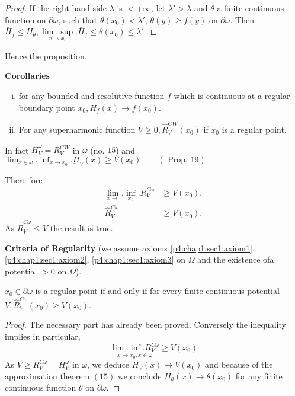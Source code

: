 \begin{proof}
  If the right hand side $\lambda$ is $< + \infty$, let $\lambda' >
  \lambda$ and $\theta$ a finite continuous function on $\partial
  \omega$, such that $\theta (x_0) < \lambda'$, $\theta (y) \geq f(y)$
  on $\partial \omega$. Then $\bar{H}_f \leq H_\theta,
  \underset{x \to {x_0}}{\lim.\sup\limits}. \bar{H}_f \leq \theta(x_0) \leq
  \lambda'$. 
\end{proof}

Hence the proposition.

\noindent
\textbf{Corollaries}
\begin{enumerate}[(i)]
\item for any bounded and resolutive function $f$ which is continuous
  at a regular boundary point $x_0, H_f (x) \to f(x_0)$. 
\item For any superharmonic function $V \geq 0, \hat{R}^{CW}_V(x_0)$
  if $x_0$ is a regular point.  
\end{enumerate}

In fact $\bar{H}^\omega_V = R^{CW}_V$ in $\omega$ (no. $15$) and
$\lim_{x \in \omega}. \inf_{x \to x_0}. \underbar{H}_V (x) \geq V(x_0)
\qquad (\text { Prop. } 19) $

There fore 
\begin{align*}
 \lim_{x \to}. \inf_{x_0}. R^{C \omega}_V
  & \geq V(x_0),\\ 
  \hat{R}^{C \omega}_V & \geq V(x_0).
\end{align*}
As $\hat{R}^{C \omega}_V \leq V$ the result is true.

\noindent
\textbf {Criteria of Regularity} (we assume axioms
\ref{p4:chap1:sec1:axiom1}, \ref{p4:chap1:sec1:axiom2},
\ref{p4:chap1:sec1:axiom3} on 
$\Omega$ and the existence of\pageoriginale a potential $> 0$ on $\Omega$). 

\begin{thm}\label{p4:chap6:sec29:thm20} %
  $x_0 \in \partial \omega$ is a regular point if and only if for every
  finite continuous potential $V, \hat{R}^{C \omega}_V (x_0) \geq
  V(x_0)$. 
\end{thm}

\begin{proof}
  The necessary part has already been proved. Conversely the
  inequality implies in particular, 
  $$
  {\underset{x \to x_0,x \in \omega}{\lim.\inf. R^{C\omega}_V}}\geq  V(x_0)
  $$ 
  As $V \geq R^{C \omega}_V = H^\omega_V$ in $\omega$, we deduce
  $H_V(x) \to V(x_0)$ and because of the approximation theorem $(15)$
  we conclude $H_\theta (x) \to \theta (x_0)$ for any finite
  continuous function $\theta$ on $\partial \omega$. 
\end{proof}

